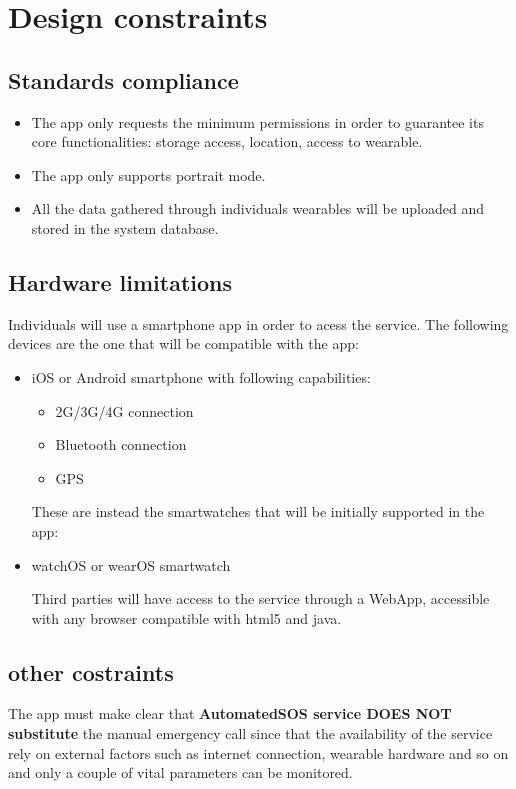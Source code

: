 \section{Design constraints}
\subsection{Standards compliance}
\begin{itemize}
\item The app only requests the minimum permissions in order to guarantee its core functionalities: storage access, location, access to wearable.
\item The app only supports portrait mode.
\item All the data gathered through individuals wearables will be uploaded and stored in the system database.
\end{itemize}


\subsection{Hardware limitations}
Individuals will use a smartphone app in order to acess the service.
The following devices are the one that will be compatible with the app:
\begin{itemize}
\item iOS or Android smartphone with following capabilities:
\begin{itemize}
\item 2G/3G/4G connection
\item Bluetooth connection
\item GPS
\end{itemize}
These are instead the smartwatches that will be initially supported in the app:
\item watchOS or wearOS smartwatch


Third parties will have access to the service through a WebApp, accessible with any browser compatible with html5 and java.
\end{itemize}

\subsection{other costraints}
The app must make clear that \textbf{AutomatedSOS service DOES NOT substitute} the manual emergency call since that the availability of the service rely on external factors such as internet connection, wearable hardware and so on and only a couple of vital parameters can be monitored.


